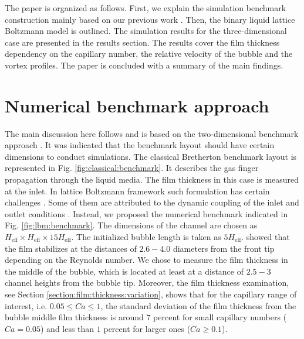 \documentclass{article}
\begin{document}
The paper is organized as follows.  First, we explain the simulation benchmark construction
mainly based on our previous work \cite{kuzmin-binary2d}. Then, the binary liquid lattice
Boltzmann model is outlined. The simulation results for the three-dimensional case are presented in
the results section. The results cover the film thickness dependency on the capillary number, the
relative velocity of the bubble and the vortex profiles. The paper
is concluded with a summary of the main findings.

\section{Numerical benchmark approach}
\label{sec:numerical:benchmark}
The main discussion here follows and is based on the two-dimensional benchmark approach
\cite{kuzmin-binary2d}. It was indicated that the benchmark layout should have certain
dimensions to conduct simulations. The classical Bretherton benchmark layout is represented in Fig.
\ref{fig:classical:benchmark}. It describes the gas finger propagation through the liquid media.
The film thickness in this case is measured at the inlet. In lattice Boltzmann framework such
formulation has certain challenges \cite{kuzmin-binary2d}. Some of them are attributed to the
dynamic coupling of the inlet and outlet conditions \cite{giavedoni-numerical}. Instead, we
proposed the numerical benchmark indicated in Fig. \ref{fig:lbm:benchmark}. The dimensions of the
channel are chosen as $H_{\mathrm{eff}}\times H_{\mathrm{eff}} \times 15 H_{\mathrm{eff}}$. The
initialized bubble length is taken as $5 H_{\mathrm{eff}}$.\citet{giavedoni-numerical} showed that
the film stabilizes at the distances of $2.6-4.0$ diameters
from the front tip depending on the Reynolds number.  We chose to measure the film thickness in the
middle of the bubble, which is located at least at a distance of $2.5-3$ channel heights from the 
bubble tip. Moreover, the film thickness examination, see Section
\ref{section:film:thickness:variation}, shows that for the capillary range of interest, i.e.
$0.05\leq Ca \leq 1$, the standard deviation of the film thickness from the bubble middle film
thickness is around $7$
percent for small capillary numbers ($Ca=0.05$) and less than $1$ percent for larger ones ($Ca
\geq 0.1$). %
\end{document}
